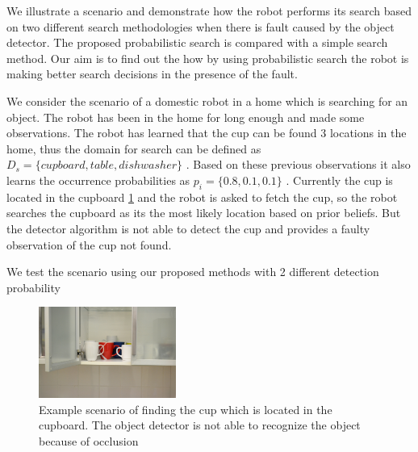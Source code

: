 We illustrate a scenario and demonstrate how the robot performs its search based on two different search methodologies when there is fault caused by the object detector. The proposed probabilistic search is compared with a simple search method. Our aim is to find out the how by using probabilistic search the robot is making better search decisions in the presence of the fault.

We consider the scenario of a domestic robot in a home which is searching for an object. The robot has been in the home for long enough and made some observations. The robot has learned that the cup can be found 3 locations in the home, thus the domain for search can be defined as $D_s = \{cupboard, table, dishwasher \}$ . Based on these previous observations it also learns the occurrence probabilities as $p_i = \{ 0.8, 0.1, 0.1\}$ . Currently the cup is located in the cupboard \ref{fig:cup_in_cupboard} and the robot is asked to fetch the cup, so the robot searches the cupboard as its the most likely location based on prior beliefs. But the detector algorithm is not able to detect the cup and provides a faulty observation of the cup not found. 

We test the scenario using our proposed methods with 2 different detection probability

\begin{figure}[htp]
\centering
\includegraphics[width=0.4\textwidth]{images/cup_cupboard.jpg}
\caption[Probabilistic search example]{Example scenario of finding the cup which is located in the cupboard. The object detector is not able to recognize the object because of occlusion}
\label{fig:cup_in_cupboard}
\end{figure}

